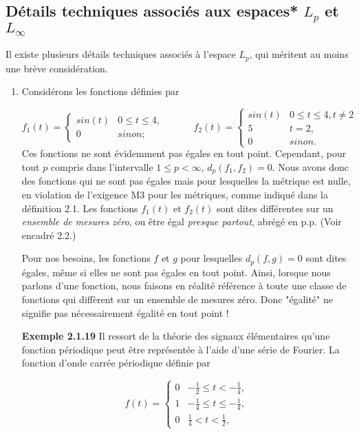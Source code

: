 \documentclass[10pt,twoside,a4paper]{book}
\begin{document}
\subsection{Détails techniques associés aux espaces* $L_p$ et $L_\infty$}
\noindent
Il existe plusieurs détails techniques associés à l'espace $L_p$, qui méritent au moins une brève considération.

\begin{enumerate}
  \item Considérons les fonctions définies par
  
  \begin{equation*}
    f_1(t) = \begin{cases} sin(t) & 0 \leq t \leq 4, \\
      0 & sinon;
          \end{cases} \quad \quad \quad
    f_2(t) = \begin{cases} sin(t) & 0 \leq t \leq 4, t \neq 2 \\
      5 & t = 2, \\
      0 & sinon.
          \end{cases}
  \end{equation*}
  \noindent
  Ces fonctions ne sont évidemment pas égales en tout point. Cependant, pour tout $p$ compris dans l'intervalle $1 \leq p < \infty$, $d_p(f_1, f_2) = 0$. Nous avons donc des fonctions qui ne sont pas égales mais pour lesquelles la métrique est nulle, en violation de l'exigence M3 pour les métriques, comme indiqué dans la définition 2.1. 
  Les fonctions $f_1(t)$ et $f_2(t)$ sont dites différentes sur un \textit{ensemble de mesures zéro}, ou être égal \textit{presque partout}, abrégé en p.p. (Voir encadré 2.2.)

  Pour nos besoins, les fonctions $f$ et $g$ pour lesquelles $d_p(f, g) = 0$ sont dites égales, même si elles ne sont pas égales en tout point. Ainsi, lorsque nous parlons d'une fonction, nous faisons en réalité référence à toute une classe de fonctions qui diffèrent sur un ensemble de mesures zéro. 
  Donc "égalité" ne signifie pas nécessairement égalité en tout point !
  \vspace{4mm}

  \noindent
  \textbf{Exemple 2.1.19} Il ressort de la théorie des signaux élémentaires qu'une fonction périodique peut être représentée à l'aide d'une série de Fourier. La fonction d'onde carrée périodique définie par

  \begin{equation*}
    f(t) = \begin{cases} 0 & - \frac{1}{2} \leq t < - \frac{1}{4}, \\
      1 &  - \frac{1}{4} \leq t \leq - \frac{1}{4}, \\
      0 & \frac{1}{4} < t < \frac{1}{2},
          \end{cases}
  \end{equation*}


\end{enumerate}
\end{document}
